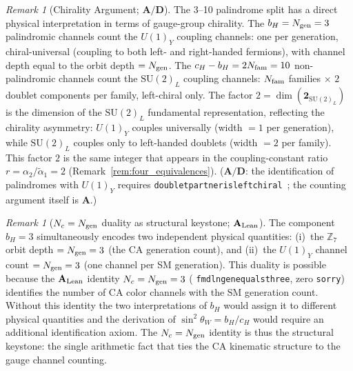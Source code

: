 \documentclass[11pt]{article}
\theoremstyle{remark}
\newtheorem{remark}[theorem]{Remark}
\newcommand{\Ngen}{N_{\rm gen}}
\newcommand{\Nfam}{N_{\rm fam}}
\newcommand{\bH}{b_H}
\newcommand{\cH}{c_H}
\newcommand{\lean}[1]{%
  \penalty-100
  \begingroup\def\_{\textunderscore\allowbreak}\texttt{#1}\endgroup}
\newcommand{\sinwsq}{\sin^2\!\theta_W}
\newcommand{\CatA}{\textbf{A}}
\newcommand{\CatAL}{\ensuremath{\textbf{A}_{\rm Lean}}}
\newcommand{\CatAD}{\textbf{A/D}}
\begin{document}
\begin{remark}[Chirality Argument; $\CatAD$]
\label{rem:chirality_argument}
The 3--10 palindrome split has a direct physical interpretation in terms of
gauge-group chirality.
The $\bH = \Ngen = 3$ palindromic channels count the $U(1)_Y$ coupling channels:
one per generation, chiral-universal (coupling to both left- and right-handed
fermions), with channel depth equal to the orbit depth $= \Ngen$.
The $\cH - \bH = 2\Nfam = 10$ non-palindromic channels count the $\mathrm{SU}(2)_L$
coupling channels: $\Nfam$ families $\times$ $2$ doublet components per family,
left-chiral only.
The factor $2 = \dim(\mathbf{2}_{\mathrm{SU}(2)_L})$ is the dimension of the
$\mathrm{SU}(2)_L$ fundamental representation, reflecting the chirality asymmetry:
$U(1)_Y$ couples universally (width $= 1$ per generation), while $\mathrm{SU}(2)_L$
couples only to left-handed doublets (width $= 2$ per family).
This factor $2$ is the same integer that appears in the coupling-constant ratio
$r = \alpha_2/\tilde{\alpha}_1 = 2$ (Remark~\ref{rem:four_equivalences}).
($\CatAD$: the identification of palindromes with $U(1)_Y$ requires
\lean{doublet\_partner\_is\_left\_chiral}~\cite{Spivack2026_UGPDynamics};
the counting argument itself is $\CatA$.)
\end{remark}

\begin{remark}[$N_c = N_{\rm gen}$ duality as structural keystone; $\CatAL$]
\label{rem:nc_ngen_keystone}
The component $\bH = 3$ simultaneously encodes two independent physical quantities:
(i)~the $\mathbb{Z}_7$ orbit depth $= \Ngen = 3$ (the CA generation count), and
(ii)~the $U(1)_Y$ channel count $= \Ngen = 3$ (one channel per SM generation).
This duality is possible because the $\CatAL$ identity $N_c = \Ngen = 3$
(\lean{fmdl\_ngen\_equals\_three}, zero \texttt{sorry}) identifies the number of CA
color channels with the SM generation count.
Without this identity the two interpretations of $\bH$ would assign it to
different physical quantities and the derivation of $\sinwsq = \bH/\cH$ would
require an additional identification axiom.
The $N_c = \Ngen$ identity is thus the structural keystone: the single arithmetic
fact that ties the CA kinematic structure to the gauge channel counting.
\end{remark}
\end{document}
